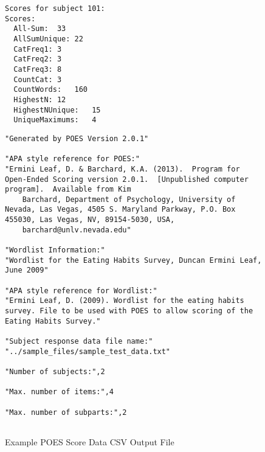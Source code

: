 \documentclass[11pt]{article}
\numberwithin{figure}{section}
\numberwithin{table}{section}
\begin{document}
\begin{figure}[htbp]
\begin{verbatim}
Scores for subject 101:
Scores:
  All-Sum:	33
  AllSumUnique:	22
  CatFreq1:	3
  CatFreq2:	3
  CatFreq3:	8
  CountCat:	3
  CountWords:	160
  HighestN:	12
  HighestNUnique:	15
  UniqueMaximums:	4\end{verbatim}
\end{figure}
\normalsize

\newpage
\begin{figure}
\caption{Example POES Score Data CSV Output File}
\label{fig:sampscoredata}
\tiny
\begin{verbatim}
"Generated by POES Version 2.0.1"

"APA style reference for POES:"
"Ermini Leaf, D. & Barchard, K.A. (2013).  Program for Open-Ended Scoring version 2.0.1.  [Unpublished computer program].  Available from Kim 
    Barchard, Department of Psychology, University of Nevada, Las Vegas, 4505 S. Maryland Parkway, P.O. Box 455030, Las Vegas, NV, 89154-5030, USA, 
    barchard@unlv.nevada.edu"

"Wordlist Information:"
"Wordlist for the Eating Habits Survey, Duncan Ermini Leaf, June 2009"

"APA style reference for Wordlist:"
"Ermini Leaf, D. (2009). Wordlist for the eating habits survey. File to be used with POES to allow scoring of the Eating Habits Survey."

"Subject response data file name:"
"../sample_files/sample_test_data.txt"

"Number of subjects:",2

"Max. number of items:",4

"Max. number of subparts:",2


\end{verbatim}
\end{figure}
\end{document}
